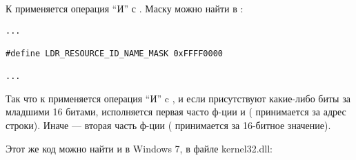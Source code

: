 К  применяется операция ``И'' с . Маску можно найти в :

\begin{lstlisting}[style=customc]
...

#define LDR_RESOURCE_ID_NAME_MASK 0xFFFF0000

...
\end{lstlisting}

Так что к  применяется операция ``И'' c , и если присутствуют какие-либо биты за младшими 16 битами,
исполняется первая часто ф-ции и ( принимается за адрес строки).
Иначе --- вторая часть ф-ции ( принимается за 16-битное значение).

Этот же код можно найти и в Windows 7, в файле kernel32.dll:

